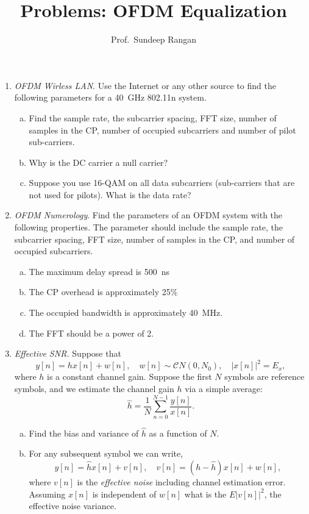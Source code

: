 \documentclass[11pt]{article}
\begin{document}
\title{Problems:  OFDM Equalization}
\author{Prof.\ Sundeep Rangan}
\date{}

\maketitle

\begin{enumerate}

\item \emph{OFDM Wirless LAN}.  Use the Internet or any other source
to find the following parameters for a 40~GHz 802.11n system.
\begin{enumerate}[(a)]
\item Find the sample rate, the subcarrier spacing,
FFT size, number of samples in the CP, number of occupied subcarriers and number of pilot sub-carriers.
\item Why is the DC carrier a null carrier?
\item Suppose you use 16-QAM on all data subcarriers (sub-carriers that
are not used for pilots).  What is the data rate?
\end{enumerate}

\item \emph{OFDM Numerology}.  Find the parameters of an OFDM system
with the following properties.  The parameter should include
the sample rate, the subcarrier spacing, FFT size, number of samples in the CP,
and number of occupied subcarriers.
\begin{enumerate}[(a)]
\item The maximum delay spread is 500~ns
\item The CP overhead is approximately 25\%
\item The occupied bandwidth is approximately 40~MHz.
\item The FFT should be a power of 2.
\end{enumerate}

\item \emph{Effective SNR.}  Suppose that 
\[
    y[n]=hx[n]+w[n], \quad w[n] \sim {\mathcal CN}(0,N_0), \quad |x[n]|^2 = E_x,
\]
where $h$ is a constant channel gain.  Suppose the first $N$ symbols are reference symbols,
and we estimate the channel gain $h$ via a simple average:
\[
    \widehat{h} = \frac{1}{N} \sum_{n=0}^{N-1} \frac{y[n]}{x[n]}.
\]
\begin{enumerate}[(a)]
\item Find the bias and variance of $\widehat{h}$ as a function of $N$.
\item For any subsequent symbol we can write,
\[
    y[n] = \widehat{h}x[n] + v[n], \quad v[n] = (h-\widehat{h})x[n] + w[n],
\]
where $v[n]$ is the \emph{effective noise} including channel estimation error.
Assuming $x[n]$ is independent of $w[n]$ what is the $E|v[n]|^2$, the effective noise variance.


\end{enumerate}
\end{enumerate}
\end{document}
